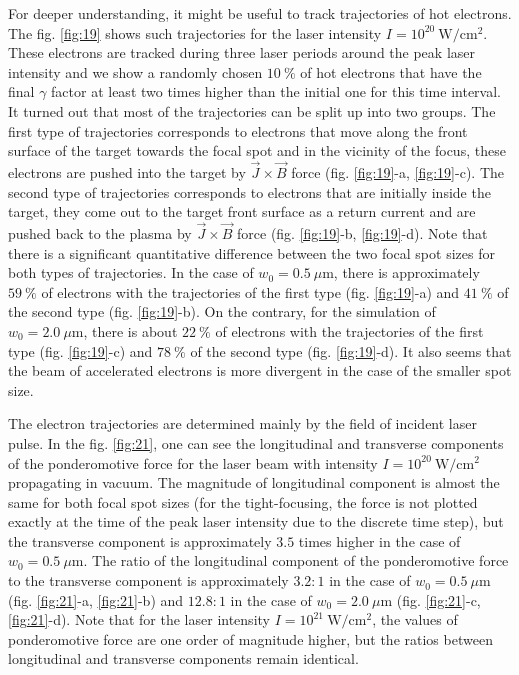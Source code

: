 For deeper understanding, it might be useful to track trajectories of hot electrons. The fig. \ref{fig:19} shows such trajectories for the laser intensity $ I = 10^{20} \ \mathrm{W/cm^2} $. These electrons are tracked during three laser periods around the peak laser intensity and we show a randomly chosen $ 10 \ \% $ of hot electrons that have the final $ \gamma $ factor at least two times higher than the initial one for this time interval. It turned out that most of the trajectories can be split up into two groups. The first type of trajectories corresponds to electrons that move along the front surface of the target towards the focal spot and in the vicinity of the focus, these electrons are pushed into the target by $ \vec{J} \times \vec{B} $ force (fig. \ref{fig:19}-a, \ref{fig:19}-c). The second type of trajectories corresponds to electrons that are initially inside the target, they come out to the target front surface as a return current and are pushed back to the plasma by $ \vec{J} \times \vec{B} $ force (fig. \ref{fig:19}-b, \ref{fig:19}-d). Note that there is a significant quantitative difference between the two focal spot sizes for both types of trajectories. In the case of $ w_0 = 0.5 \ \mu\mathrm{m} $, there is approximately $ 59 \ \% $ of electrons with the trajectories of the first type (fig. \ref{fig:19}-a) and $ 41 \ \% $ of the second type (fig. \ref{fig:19}-b). On the contrary, for the simulation of $ w_0 = 2.0 \ \mu\mathrm{m} $, there is about $ 22 \ \% $ of electrons with the trajectories of the first type (fig. \ref{fig:19}-c) and $ 78 \ \% $ of the second type (fig. \ref{fig:19}-d). It also seems that the beam of accelerated electrons is more divergent in the case of the smaller spot size.

The electron trajectories are determined mainly by the field of incident laser pulse. In the fig. \ref{fig:21}, one can see the longitudinal and transverse components of the ponderomotive force for the laser beam with intensity $ I = 10^{20} \ \mathrm{W/cm^2} $ propagating in vacuum. The magnitude of longitudinal component is almost the same for both focal spot sizes (for the tight-focusing, the force is not plotted exactly at the time of the peak laser intensity due to the discrete time step), but the transverse component is approximately $ 3.5 $ times higher in the case of $ w_0 = 0.5 \ \mu\mathrm{m} $. The ratio of the longitudinal component of the ponderomotive force to the transverse component is approximately $ 3.2:1 $ in the case of $ w_0 = 0.5 \ \mu\mathrm{m} $ (fig. \ref{fig:21}-a, \ref{fig:21}-b) and $ 12.8:1 $ in the case of $ w_0 = 2.0 \ \mu\mathrm{m} $ (fig. \ref{fig:21}-c, \ref{fig:21}-d). Note that for the laser intensity $ I = 10^{21} \ \mathrm{W/cm^2} $, the values of ponderomotive force are one order of magnitude higher, but the ratios between longitudinal and transverse components remain identical.

